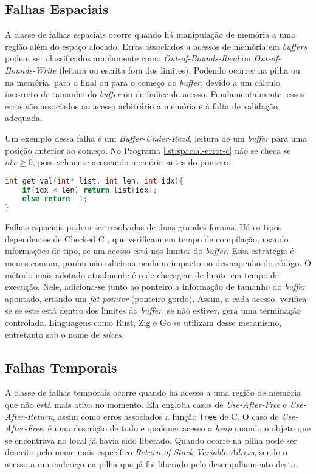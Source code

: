 \subsection{Falhas Espaciais}
\label{sec:mem-error:spacial}

A classe de falhas espaciais ocorre quando há manipulação de memória a uma região além do espaço alocado. Erros associados a acessos de memória em \emph{buffers} podem ser classificados amplamente como \emph{Out-of-Bounds-Read} ou \emph{Out-of-Bounds-Write} (leitura ou escrita fora dos limites). Podendo ocorrer na pilha ou na memória, para o final ou para o começo do \emph{buffer}, devido a um cálculo incorreto de tamanho do \emph{buffer} ou de índice de acesso.  Fundamentalmente, esses erros são associados ao acesso arbitrário a memória e à falta de validação adequada.

Um exemplo dessa falha é um \emph{Buffer-Under-Read}, 
leitura de um \emph{buffer} para uma posição anterior ao começo. No Programa \ref{lst:spacial-error-c}
não se checa se $idx \ge 0$, possivelmente acessando memória antes do ponteiro.

\begin{lstlisting}[language=C ,label={lst:spacial-error-c}, caption=Exemplo de uma Falha Espacial]
int get_val(int* list, int len, int idx){
	if(idx < len) return list[idx];
 	else return -1;
}
\end{lstlisting}

Falhas espaciais podem ser resolvidas de duas grandes formas. Há os tipos dependentes de Checked C \cite{CHECKEDC}, que verificam em tempo de compilação, usando informações de tipo, se um acesso está nos limites do \emph{buffer}. Essa estratégia é menos comum, porém não adiciona nenhum impacto no desempenho do código. 
O método mais adotado atualmente é o de checagem de limite em tempo de execução. Nele, adiciona-se junto ao ponteiro a informação de tamanho do \emph{buffer} apontado, criando um \emph{fat-pointer} (ponteiro gordo). Assim, a cada acesso, verifica-se se este está dentro dos limites do \emph{buffer}, se não estiver, gera uma terminação controlada. Linguagens como Rust, Zig e Go se utilizam desse mecanismo, entretanto sob o nome de \emph{slices}.


\subsection{Falhas Temporais}
\label{sec:mem-error:temporal}

A classe de falhas temporais ocorre quando há acesso a uma região de memória que não está mais ativa no momento. Ela engloba casos de \emph{Use-After-Free} e \emph{Use-After-Return}, assim como erros associados a função \lstinline[language=C]|free| de C. O caso de \emph{Use-After-Free}, é uma descrição de todo e qualquer acesso a \emph{heap} quando o objeto que se encontrava no local já havia sido liberado. Quando ocorre na pilha pode ser descrito pelo nome mais específico \emph{Return-of-Stack-Variable-Adress}, sendo o acesso a um endereço na pilha que já foi liberado pelo desempilhamento desta.

